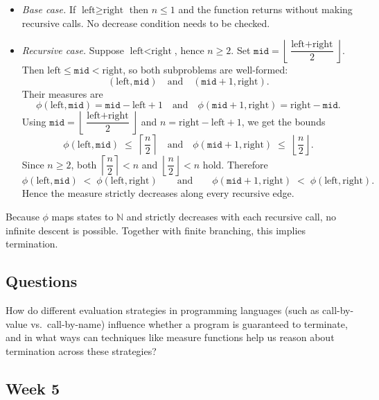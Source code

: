 \documentclass{article}
\theoremstyle{theorem}
\theoremstyle{definition}
\theoremstyle{remark}
\begin{document}
\begin{itemize}
  \item \emph{Base case.} If \(\text{left}\ge \text{right}\) then \(n\le 1\) and the function returns without making recursive calls. No decrease condition needs to be checked.

  \item \emph{Recursive case.} Suppose \(\text{left}<\text{right}\), hence \(n\ge 2\).
  Set \(\texttt{mid}=\left\lfloor \dfrac{\text{left}+\text{right}}{2}\right\rfloor\).
  Then \(\text{left}\le \texttt{mid}<\text{right}\), so both subproblems are well-formed:
  \[
  (\text{left},\texttt{mid}) \quad\text{and}\quad (\texttt{mid}+1,\text{right}).
  \]
  Their measures are
  \[
  \phi(\text{left},\texttt{mid})=\texttt{mid}-\text{left}+1
  \quad\text{and}\quad
  \phi(\texttt{mid}+1,\text{right})=\text{right}-\texttt{mid}.
  \]
  Using \(\texttt{mid}=\left\lfloor \dfrac{\text{left}+\text{right}}{2}\right\rfloor\) and \(n=\text{right}-\text{left}+1\), we get the bounds
  \[
  \phi(\text{left},\texttt{mid}) \;\le\; \left\lceil \frac{n}{2} \right\rceil
  \quad\text{and}\quad
  \phi(\texttt{mid}+1,\text{right}) \;\le\; \left\lfloor \frac{n}{2} \right\rfloor.
  \]
  Since \(n\ge 2\), both \(\left\lceil \dfrac{n}{2}\right\rceil<n\) and \(\left\lfloor \dfrac{n}{2}\right\rfloor<n\) hold. Therefore
  \[
  \phi(\text{left},\texttt{mid}) \;<\; \phi(\text{left},\text{right})
  \qquad\text{and}\qquad
  \phi(\texttt{mid}+1,\text{right}) \;<\; \phi(\text{left},\text{right}).
  \]
  Hence the measure strictly decreases along every recursive edge.
\end{itemize}

Because \(\phi\) maps states to \(\mathbb{N}\) and strictly decreases with each recursive call,
no infinite descent is possible. Together with finite branching, this implies termination.

\subsection{Questions}

How do different evaluation strategies in programming languages (such as call-by-value vs.\ call-by-name) influence whether a program is guaranteed to terminate, and in what ways can techniques like measure functions help us reason about termination across these strategies?

\subsection{Week 5}
\end{document}
